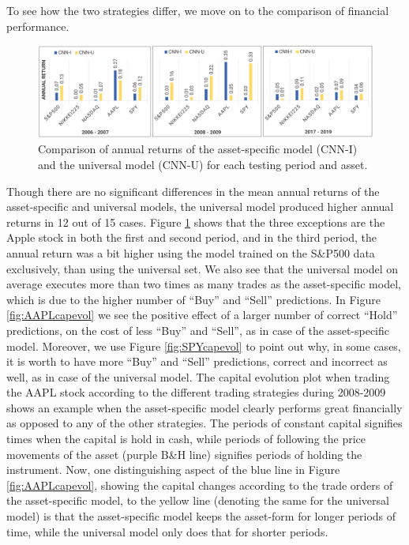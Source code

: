 \documentclass[12pt, a4paper]{article}
\begin{document}
To see how the two strategies differ, we move on to the comparison of financial performance.
\begin{figure}[ht]
    \centering
    \includegraphics[width=\textwidth]{images/CNNIvsCNNU.png}
    \caption{Comparison of annual returns of the asset-specific model (CNN-I) and the universal model (CNN-U) for each testing period and asset.}
    \label{fig:CNNIvsCNNU}
\end{figure}
Though there are no significant differences in the mean annual returns of the asset-specific and universal models, the universal model produced higher annual returns in 12 out of 15 cases. 
Figure \ref{fig:CNNIvsCNNU} shows that the three exceptions are the Apple stock in both the first and second period, and in the third period, the annual return was a bit higher using the model trained on the S\&P500 data exclusively, than using the universal set. We also see that the universal model on average executes more than two times as many trades as the asset-specific model, which is due to the higher number of “Buy” and “Sell” predictions. 
In Figure \ref{fig:AAPLcapevol} we see the positive effect of a larger number of correct “Hold” predictions, on the cost of less “Buy” and “Sell”, as in case of the asset-specific model.
Moreover, we use Figure \ref{fig:SPYcapevol} to point out why, in some cases, it is worth to have more “Buy” and “Sell” predictions, correct and incorrect as well, as in case of the universal model. 
The capital evolution plot when trading the AAPL stock according to the different trading strategies during 2008-2009 shows an example when the asset-specific model clearly performs great financially as opposed to any of the other strategies. The periods of constant capital signifies times when the capital is hold in cash, while periods of following the price movements of the asset (purple B\&H line) signifies periods of holding the instrument. Now, one distinguishing aspect of the blue line in Figure \ref{fig:AAPLcapevol}, showing the capital changes according to the trade orders of the asset-specific model, to the yellow line (denoting the same for the universal model) is that the asset-specific model keeps the asset-form for longer periods of time, while the universal model only does that for shorter periods. 
\end{document}
